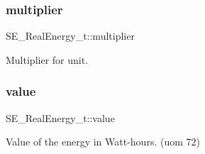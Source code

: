 \subsubsection{\texorpdfstring{multiplier}{multiplier}}
{\footnotesize\ttfamily S\+E\+\_\+\+Real\+Energy\+\_\+t\+::multiplier}

Multiplier for \textquotesingle{}unit\textquotesingle{}. \mbox{\label{group__RealEnergy_ga9995a7c4d5cf5ad6283eea0d8b343426}} 
\subsubsection{\texorpdfstring{value}{value}}
{\footnotesize\ttfamily S\+E\+\_\+\+Real\+Energy\+\_\+t\+::value}

Value of the energy in Watt-\/hours. (uom 72) 